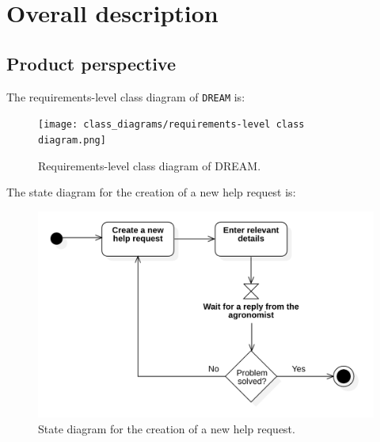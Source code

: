 \documentclass{article}
\begin{document}
\section{Overall description}
\subsection{Product perspective}
The requirements-level class diagram of \verb|DREAM| is:
\begin{figure}[H]
    \centering
	\texttt{[image: class\_diagrams/requirements-level class diagram.png]}
    \caption{Requirements-level class diagram of DREAM.}
\end{figure}

The state diagram for the creation of a new help request is:
\begin{figure}[H]
    \centering
	\includegraphics[scale=0.35]{state_machine_diagrams/statediagram1.png}
    \caption{State diagram for the creation of a new help request.}
\end{figure}
\end{document}
